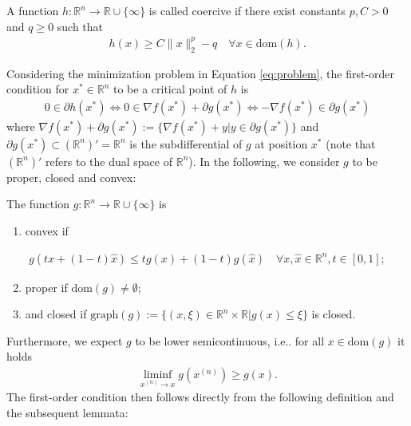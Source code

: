 \documentclass[onecolumn,final,a4paper,13pt,reqno]{siamart}
\makeatletter
\DeclareRobustCommand\onedot{\futurelet\@let@token\@onedot}
\def\@onedot{\ifx\@let@token.\else.\null\fi\xspace}
\def\ie{{i.e}\onedot} \def\Ie{{I.e}\onedot}
\def\dom{\text{dom}}
\makeatother
\begin{document}
\begin{definitionmd}
	A function $h: \mathbb{R}^n \rightarrow \mathbb{R} \cup \{\infty\}$ is called coercive if there exist constants $p, C > 0$ and $q \geq 0$ such that
	\begin{align}
		h(x) \geq C \|x\|_2^p - q\quad \forall x \in \dom(h).
	\end{align}
\end{definitionmd}

Considering the minimization problem in Equation \eqref{eq:problem}, the first-order condition for $x^\ast \in \mathbb{R}^n$ to be a critical point of $h$ is
\begin{align}
	0 \in \partial h(x^\ast) \Leftrightarrow 0 \in \nabla f(x^\ast) + \partial g(x^\ast) \Leftrightarrow - \nabla f(x^\ast) \in \partial g(x^\ast)
\end{align}
where $\nabla f(x^\ast) + \partial g(x^\ast) := \{ \nabla f(x^\ast) + y | y \in \partial g(x^\ast)\}$ and $\partial g(x^\ast) \subset (\mathbb{R}^n)' = \mathbb{R}^n$ is the subdifferential of $g$ at position $x^\ast$ (note that $(\mathbb{R}^n)'$ refers to the dual space of $\mathbb{R}^n$). In the following, we consider $g$ to be proper, closed and convex:

\begin{definitionmd}
	The function $g :\mathbb{R}^n \rightarrow \mathbb{R} \cup \{\infty\}$ is
	\begin{enumerate}[label=(\alph*)]
		\item convex if
	\end{enumerate}
	\begin{align}
		g(tx + (1 - t)\hat{x}) \leq tg(x) + (1- t)g(\hat{x})\quad\forall x,\hat{x} \in \mathbb{R}^n, t \in [0,1];
	\end{align}
	\begin{enumerate}[label=(\alph*)]
		\setcounter{enumi}{1}
		\item proper if $\dom(g) \neq \emptyset$;
		\item and closed if $\text{graph}(g) := \{(x, \xi) \in \mathbb{R}^n \times \mathbb{R} | g(x) \leq \xi\}$ is closed.
	\end{enumerate}
\end{definitionmd}

Furthermore, we expect $g$ to be lower semicontinuous, \ie for all $x \in \dom(g)$ it holds
\begin{align}
	\liminf_{x^{(n)} \rightarrow x} g(x^{(n)}) \geq g(x).
\end{align}
The first-order condition then follows directly from the following definition and the subsequent lemmata:
\end{document}
